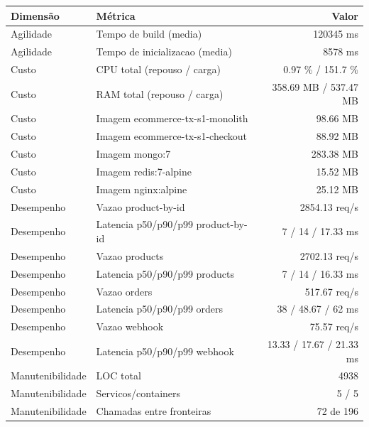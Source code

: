 \begin{quadro}[htb]
  \centering
  \caption{Métricas (ecommerce, transacoes, snapshot-1).}
  \label{qua:metricas-ecommerce-transacoes-snapshot-1}
  \renewcommand{\arraystretch}{1.15}
  \begin{tabular}{|l|l|r|}
    \hline
    \textbf{Dimensão} & \textbf{Métrica} & \textbf{Valor} \\
    \hline
    Agilidade & Tempo de build (media) & 120345 ms \\ \hline
    Agilidade & Tempo de inicializacao (media) & 8578 ms \\ \hline
    Custo & CPU total (repouso / carga) & 0.97 \% / 151.7 \% \\ \hline
    Custo & RAM total (repouso / carga) & 358.69 MB / 537.47 MB \\ \hline
    Custo & Imagem ecommerce-tx-s1-monolith & 98.66 MB \\ \hline
    Custo & Imagem ecommerce-tx-s1-checkout & 88.92 MB \\ \hline
    Custo & Imagem mongo:7 & 283.38 MB \\ \hline
    Custo & Imagem redis:7-alpine & 15.52 MB \\ \hline
    Custo & Imagem nginx:alpine & 25.12 MB \\ \hline
    Desempenho & Vazao product-by-id & 2854.13 req/s \\ \hline
    Desempenho & Latencia p50/p90/p99 product-by-id & 7 / 14 / 17.33 ms \\ \hline
    Desempenho & Vazao products & 2702.13 req/s \\ \hline
    Desempenho & Latencia p50/p90/p99 products & 7 / 14 / 16.33 ms \\ \hline
    Desempenho & Vazao orders & 517.67 req/s \\ \hline
    Desempenho & Latencia p50/p90/p99 orders & 38 / 48.67 / 62 ms \\ \hline
    Desempenho & Vazao webhook & 75.57 req/s \\ \hline
    Desempenho & Latencia p50/p90/p99 webhook & 13.33 / 17.67 / 21.33 ms \\ \hline
    Manutenibilidade & LOC total & 4938 \\ \hline
    Manutenibilidade & Servicos/containers & 5 / 5 \\ \hline
    Manutenibilidade & Chamadas entre fronteiras & 72 de 196 \\ \hline
  \end{tabular}
\end{quadro}

